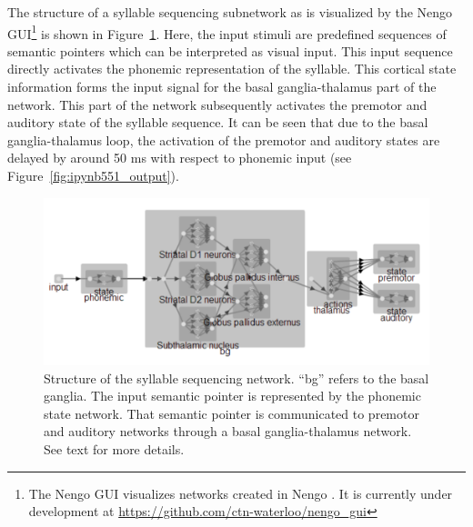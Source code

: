\documentclass[conference]{IEEEtran}
\begin{document}
The structure of a syllable sequencing subnetwork
as is visualized by the Nengo GUI\footnote{
  The Nengo GUI visualizes networks created in Nengo
  \cite{bekolay2014}. It is currently under development
  at \url{https://github.com/ctn-waterloo/nengo_gui}}
is shown in Figure~\ref{fig:ipynb551_structure}.
Here, the input stimuli are predefined sequences of semantic pointers
which can be interpreted as visual input. This input sequence
directly activates the phonemic representation of the syllable.
This cortical state information forms the input signal for the
basal ganglia-thalamus part of the network. This part of the
network subsequently activates the premotor and auditory state
of the syllable sequence. It can be seen that due to the basal
ganglia-thalamus loop, the activation of the premotor and auditory
states are delayed by around 50 ms with respect to phonemic input
(see Figure~\ref{fig:ipynb551_output}).

\begin{figure}
\centering
\includegraphics[width=\columnwidth]{ipynb551_structure}
\caption{Structure of the syllable sequencing network. ``bg''
  refers to the basal ganglia. The input semantic pointer is
  represented by the phonemic state network.
  That semantic pointer is communicated to premotor and auditory
  networks through a basal ganglia-thalamus network. See text
  for more details.}
\label{fig:ipynb551_structure}
\end{figure}
\end{document}
